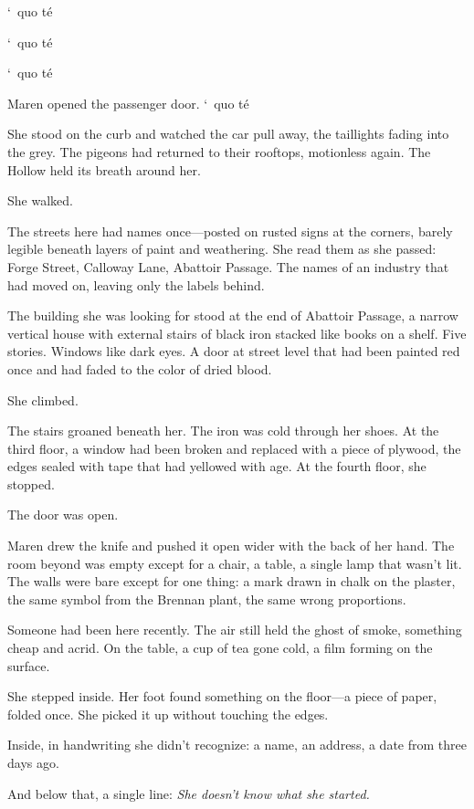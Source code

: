 \documentclass[12pt,letterpaper,openany]{book}
\begin{document}
\par
`\ quo t\'e{}
\par
`\ quo t\'e{}
\par
`\ quo t\'e{}
\par
Maren opened the passenger door. `\ quo t\'e{}
\par
She stood on the curb and watched the car pull away, the taillights fading into the grey. The pigeons had returned to their rooftops, motionless again. The Hollow held its breath around her.
\par
She walked.
\par
The streets here had names once—posted on rusted signs at the corners, barely legible beneath layers of paint and weathering. She read them as she passed: Forge Street, Calloway Lane, Abattoir Passage. The names of an industry that had moved on, leaving only the labels behind.
\par
The building she was looking for stood at the end of Abattoir Passage, a narrow vertical house with external stairs of black iron stacked like books on a shelf. Five stories. Windows like dark eyes. A door at street level that had been painted red once and had faded to the color of dried blood.
\par
She climbed.
\par
The stairs groaned beneath her. The iron was cold through her shoes. At the third floor, a window had been broken and replaced with a piece of plywood, the edges sealed with tape that had yellowed with age. At the fourth floor, she stopped.
\par
The door was open.
\par
Maren drew the knife and pushed it open wider with the back of her hand. The room beyond was empty except for a chair, a table, a single lamp that wasn't lit. The walls were bare except for one thing: a mark drawn in chalk on the plaster, the same symbol from the Brennan plant, the same wrong proportions.
\par
Someone had been here recently. The air still held the ghost of smoke, something cheap and acrid. On the table, a cup of tea gone cold, a film forming on the surface.
\par
She stepped inside. Her foot found something on the floor—a piece of paper, folded once. She picked it up without touching the edges.
\par
Inside, in handwriting she didn't recognize: a name, an address, a date from three days ago.
\par
And below that, a single line: \textit{She doesn't know what she started.}
\end{document}
